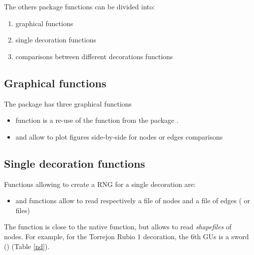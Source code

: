 \documentclass[article]{jss}\usepackage{knitr}
\begin{document}
The others  package functions can be divided into:
\begin{enumerate}
\item graphical functions
\item single decoration functions
\item comparisons between different decorations functions
\end{enumerate}

\subsection{Graphical functions} \label{sec:functions_gr}

The  package has three graphical functions
\begin{itemize}
\setlength\itemsep{.1em}
\item {} function is a re-use of the  function from the  package \citep{Snow20}.
\item {} and  allow to plot figures side-by-side for nodes or edges comparisons
\end{itemize}

\subsection{Single decoration functions} \label{sec:functions_one}

Functions allowing to create a RNG for a single decoration are:

\begin{itemize}
\setlength\itemsep{.1em}
\item {} and  functions allow to read respectively a file of nodes and a file of edges ( or  files)
\end{itemize}

The  function is close to the  native  function, but allows to read \emph{shapefiles} of nodes. For example, for the Torrejon Rubio 1 decoration, the 6th GUs is a sword () (Table \ref{nd}).
\end{document}
